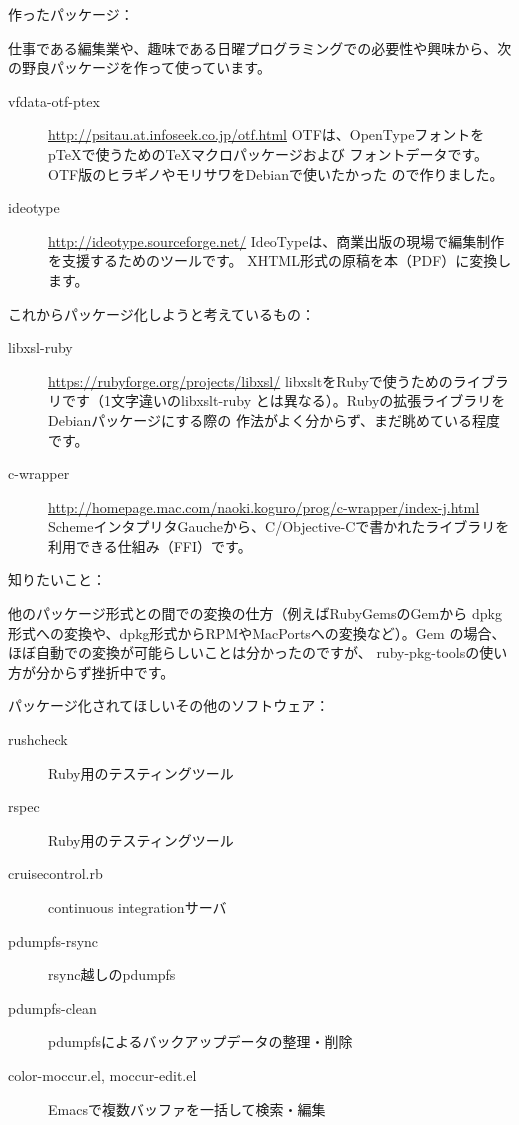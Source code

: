 \documentclass[mingoth,a4paper]{jsarticle}
\begin{document}
作ったパッケージ：

仕事である編集業や、趣味である日曜プログラミングでの必要性や興味から、次
の野良パッケージを作って使っています。

\begin{description}
 \item[vfdata-otf-ptex]
  \url{http://psitau.at.infoseek.co.jp/otf.html}
  OTFは、OpenTypeフォントをpTeXで使うためのTeXマクロパッケージおよび
  フォントデータです。OTF版のヒラギノやモリサワをDebianで使いたかった
  ので作りました。

 \item[ideotype]
  \url{http://ideotype.sourceforge.net/}
  IdeoTypeは、商業出版の現場で編集制作を支援するためのツールです。
  XHTML形式の原稿を本（PDF）に変換します。
\end{description}

これからパッケージ化しようと考えているもの：

\begin{description}
\item[libxsl-ruby]
	   \url{https://rubyforge.org/projects/libxsl/}
  libxsltをRubyで使うためのライブラリです（1文字違いのlibxslt-ruby
  とは異なる）。Rubyの拡張ライブラリをDebianパッケージにする際の
  作法がよく分からず、まだ眺めている程度です。

\item[c-wrapper]
	   \url{http://homepage.mac.com/naoki.koguro/prog/c-wrapper/index-j.html}
  SchemeインタプリタGaucheから、C/Objective-Cで書かれたライブラリを
  利用できる仕組み（FFI）です。
\end{description}

知りたいこと：

  他のパッケージ形式との間での変換の仕方（例えばRubyGemsのGemから
  dpkg形式への変換や、dpkg形式からRPMやMacPortsへの変換など）。Gem
  の場合、ほぼ自動での変換が可能らしいことは分かったのですが、
  ruby-pkg-toolsの使い方が分からず挫折中です。

パッケージ化されてほしいその他のソフトウェア：

\begin{description}
 \item[rushcheck]        Ruby用のテスティングツール
 \item[rspec]            Ruby用のテスティングツール
 \item[cruisecontrol.rb] continuous integrationサーバ
 \item[pdumpfs-rsync]    rsync越しのpdumpfs
 \item[pdumpfs-clean]    pdumpfsによるバックアップデータの整理・削除
 \item[color-moccur.el, moccur-edit.el]
                   Emacsで複数バッファを一括して検索・編集
\end{description}
\end{document}
